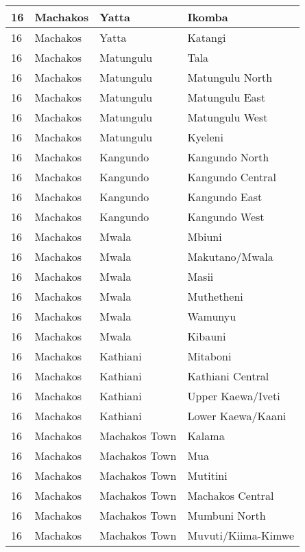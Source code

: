 \begin{table}[!ht]
\begin{tabular}{|l|l|l|l|}
        16 & Machakos & Yatta & Ikomba \\ \hline
        16 & Machakos & Yatta & Katangi \\ \hline
        16 & Machakos & Matungulu & Tala \\ \hline
        16 & Machakos & Matungulu & Matungulu North \\ \hline
        16 & Machakos & Matungulu & Matungulu East \\ \hline
        16 & Machakos & Matungulu & Matungulu West \\ \hline
        16 & Machakos & Matungulu & Kyeleni \\ \hline
        16 & Machakos & Kangundo & Kangundo North \\ \hline
        16 & Machakos & Kangundo & Kangundo Central \\ \hline
        16 & Machakos & Kangundo & Kangundo East \\ \hline
        16 & Machakos & Kangundo & Kangundo West \\ \hline
        16 & Machakos & Mwala & Mbiuni \\ \hline
        16 & Machakos & Mwala & Makutano/Mwala \\ \hline
        16 & Machakos & Mwala & Masii \\ \hline
        16 & Machakos & Mwala & Muthetheni \\ \hline
        16 & Machakos & Mwala & Wamunyu \\ \hline
        16 & Machakos & Mwala & Kibauni \\ \hline
        16 & Machakos & Kathiani & Mitaboni \\ \hline
        16 & Machakos & Kathiani & Kathiani Central \\ \hline
        16 & Machakos & Kathiani & Upper Kaewa/Iveti \\ \hline
        16 & Machakos & Kathiani & Lower Kaewa/Kaani \\ \hline
        16 & Machakos & Machakos Town & Kalama \\ \hline
        16 & Machakos & Machakos Town & Mua \\ \hline
        16 & Machakos & Machakos Town & Mutitini \\ \hline
        16 & Machakos & Machakos Town & Machakos Central \\ \hline
        16 & Machakos & Machakos Town & Mumbuni North \\ \hline
        16 & Machakos & Machakos Town & Muvuti/Kiima-Kimwe \\ \hline

\end{tabular}
\end{table}
